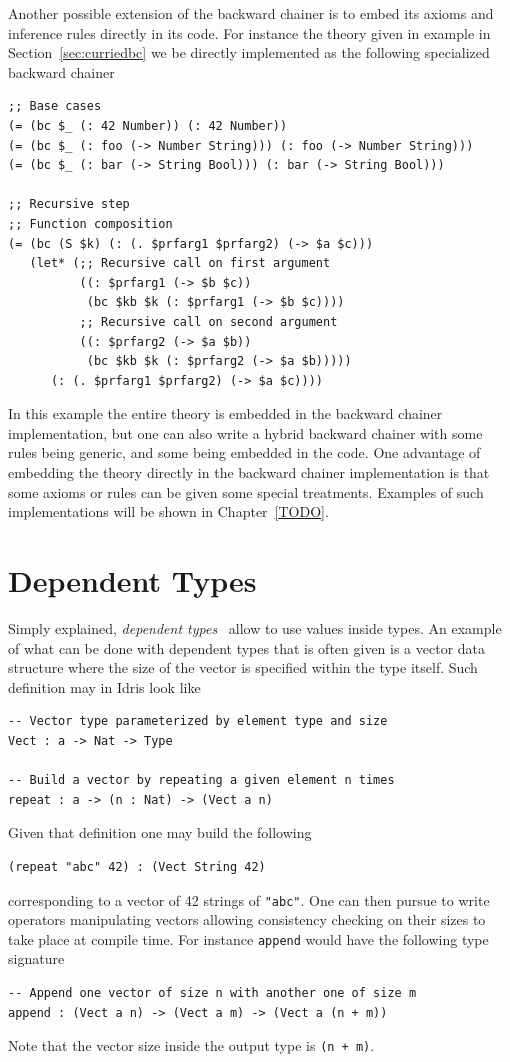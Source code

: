 \documentclass[]{report}
\begin{document}
Another possible extension of the backward chainer is to embed its
axioms and inference rules directly in its code.  For instance the
theory given in example in Section~\ref{sec:curriedbc} we be directly
implemented as the following specialized backward chainer

\begin{verbatim}
;; Base cases
(= (bc $_ (: 42 Number)) (: 42 Number))
(= (bc $_ (: foo (-> Number String))) (: foo (-> Number String)))
(= (bc $_ (: bar (-> String Bool))) (: bar (-> String Bool)))

;; Recursive step
;; Function composition
(= (bc (S $k) (: (. $prfarg1 $prfarg2) (-> $a $c)))
   (let* (;; Recursive call on first argument
          ((: $prfarg1 (-> $b $c))
           (bc $kb $k (: $prfarg1 (-> $b $c))))
          ;; Recursive call on second argument
          ((: $prfarg2 (-> $a $b))
           (bc $kb $k (: $prfarg2 (-> $a $b)))))
      (: (. $prfarg1 $prfarg2) (-> $a $c))))
\end{verbatim}
In this example the entire theory is embedded in the backward chainer
implementation, but one can also write a hybrid backward chainer with
some rules being generic, and some being embedded in the code.  One
advantage of embedding the theory directly in the backward chainer
implementation is that some axioms or rules can be given some special
treatments.  Examples of such implementations will be shown in
Chapter~\ref{TODO}.

\section{Dependent Types}

Simply explained, \emph{dependent types}~\cite{TODO} allow to use
values inside types.  An example of what can be done with dependent
types that is often given is a vector data structure where the size of
the vector is specified within the type itself.  Such definition may
in Idris look like
\begin{verbatim}
-- Vector type parameterized by element type and size
Vect : a -> Nat -> Type

-- Build a vector by repeating a given element n times
repeat : a -> (n : Nat) -> (Vect a n)
\end{verbatim}
Given that definition one may build the following
\begin{verbatim}
(repeat "abc" 42) : (Vect String 42)
\end{verbatim}
corresponding to a vector of 42 strings of \texttt{"abc"}.
One can then pursue to write operators manipulating vectors allowing
consistency checking on their sizes to take place at compile time.
For instance \texttt{append} would have the following type
signature
\begin{verbatim}
-- Append one vector of size n with another one of size m
append : (Vect a n) -> (Vect a m) -> (Vect a (n + m))
\end{verbatim}
Note that the vector size inside the output type is
\texttt{(n + m)}.\\
\end{document}
